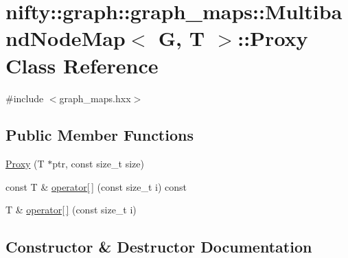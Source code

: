 \hypertarget{classnifty_1_1graph_1_1graph__maps_1_1MultibandNodeMap_1_1Proxy}{}\section{nifty\+:\+:graph\+:\+:graph\+\_\+maps\+:\+:Multiband\+Node\+Map$<$ G, T $>$\+:\+:Proxy Class Reference}
\label{classnifty_1_1graph_1_1graph__maps_1_1MultibandNodeMap_1_1Proxy}


{\ttfamily \#include $<$graph\+\_\+maps.\+hxx$>$}

\subsection*{Public Member Functions}
\begin{DoxyCompactItemize}
\item 
\hyperlink{classnifty_1_1graph_1_1graph__maps_1_1MultibandNodeMap_1_1Proxy_a26ae9fa3333ec8adf5f74ad053982895}{Proxy} (T $\ast$ptr, const size\+\_\+t size)
\item 
const T \& \hyperlink{classnifty_1_1graph_1_1graph__maps_1_1MultibandNodeMap_1_1Proxy_a492fd36162499ac45136fbde2aad34e0}{operator\mbox{[}$\,$\mbox{]}} (const size\+\_\+t i) const
\item 
T \& \hyperlink{classnifty_1_1graph_1_1graph__maps_1_1MultibandNodeMap_1_1Proxy_a8786949cbdef794607129337c0aeff3e}{operator\mbox{[}$\,$\mbox{]}} (const size\+\_\+t i)
\end{DoxyCompactItemize}


\subsection{Constructor \& Destructor Documentation}
\mbox{\label{classnifty_1_1graph_1_1graph__maps_1_1MultibandNodeMap_1_1Proxy_a26ae9fa3333ec8adf5f74ad053982895}} 
